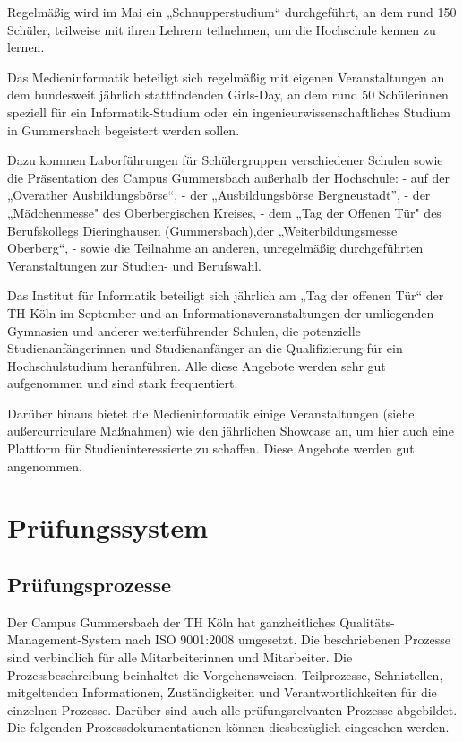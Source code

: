 Regelmäßig wird im Mai ein „Schnupperstudium`` durchgeführt, an dem rund
150 Schüler, teilweise mit ihren Lehrern teilnehmen, um die Hochschule
kennen zu lernen.

Das Medieninformatik beteiligt sich regelmäßig mit eigenen
Veranstaltungen an dem bundesweit jährlich stattfindenden Girls-Day, an
dem rund 50 Schülerinnen speziell für ein Informatik-Studium oder ein
ingenieurwissenschaftliches Studium in Gummersbach begeistert werden
sollen.

Dazu kommen Laborführungen für Schülergruppen verschiedener Schulen
sowie die Präsentation des Campus Gummersbach außerhalb der Hochschule:
- auf der „Overather Ausbildungsbörse``, - der „Ausbildungsbörse
Bergneustadt'', - der „Mädchenmesse" des Oberbergischen Kreises, - dem
„Tag der Offenen Tür" des Berufskollegs Dieringhausen (Gummersbach),der
„Weiterbildungsmesse Oberberg``, - sowie die Teilnahme an anderen,
unregelmäßig durchgeführten Veranstaltungen zur Studien- und Berufswahl.

Das Institut für Informatik beteiligt sich jährlich am „Tag der offenen
Tür`` der TH-Köln im September und an Informationsveranstaltungen der
umliegenden Gymnasien und anderer weiterführender Schulen, die
potenzielle Studienanfängerinnen und Studienanfänger an die
Qualifizierung für ein Hochschulstudium heranführen. Alle diese Angebote
werden sehr gut aufgenommen und sind stark frequentiert.

Darüber hinaus bietet die Medieninformatik einige Veranstaltungen (siehe
außercurriculare Maßnahmen) wie den jährlichen Showcase an, um hier auch
eine Plattform für Studieninteressierte zu schaffen. Diese Angebote
werden gut angenommen.

\chapter{Prüfungssystem\label{/mi-2017/selbstbericht/0600-pruefungssystem/0000-pruefungssystem}}\label{pruxfcfungssystempathlabelmi-2017selbstbericht0600-pruefungssystem0000-pruefungssystem}

\section{Prüfungsprozesse\label{/mi-2017/selbstbericht/0600-pruefungssystem/0000-pruefungssystem}}\label{pruxfcfungsprozessepathlabelmi-2017selbstbericht0600-pruefungssystem0000-pruefungssystem}

Der Campus Gummersbach der TH Köln hat ganzheitliches
Qualitäts-Management-System nach ISO 9001:2008 umgesetzt. Die
beschriebenen Prozesse sind verbindlich für alle Mitarbeiterinnen und
Mitarbeiter. Die Prozessbeschreibung beinhaltet die Vorgehensweisen,
Teilprozesse, Schnistellen, mitgeltenden Informationen, Zuständigkeiten
und Verantwortlichkeiten für die einzelnen Prozesse. Darüber sind auch
alle prüfungsrelvanten Prozesse abgebildet. Die folgenden
Prozessdokumentationen können diesbezüglich eingesehen werden.

